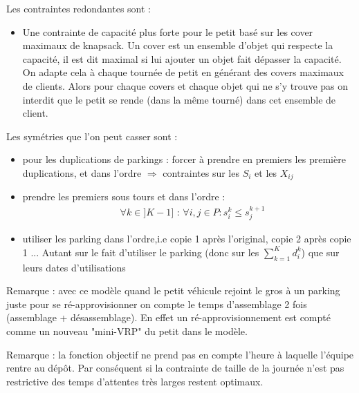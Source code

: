 \documentclass[12pt,a4paper,fleqn]{article}
\begin{document}
\clearpage

Les contraintes redondantes sont :
\begin{itemize}
\item Une contrainte de capacité plus forte pour le petit basé sur les cover maximaux de knapsack. Un cover est un ensemble d'objet qui respecte la capacité, il est dit maximal si lui ajouter un objet fait dépasser la capacité. On adapte cela à chaque tournée de petit en générant des covers maximaux de clients. Alors pour chaque covers et chaque objet qui ne s'y trouve pas on interdit que le petit se rende (dans la même tourné) dans cet ensemble de client.
\end{itemize}


Les symétries que l'on peut casser sont :
\begin{itemize}
\item pour les duplications de parkings : forcer à prendre en premiers les première duplications, et dans l'ordre $\Rightarrow$ contraintes sur les $S_i$ et les $X_{ij}$
\item prendre les premiers sous tours et dans l'ordre :
\begin{align}
& \forall k \in ]K-1] \text{ : } \forall i,j \in P : s^k_i \leqslant s^{k+1}_j \label{symetriesoustours2}
\end{align}
\item utiliser les parking dans l'ordre,i.e copie 1 après l'original, copie 2 après copie 1 ... Autant sur le fait d'utiliser le parking (donc sur les $\sum \limits_{k = 1}^K d_i^k$) que sur leurs dates d'utilisations
\end{itemize}

\bigskip

Remarque : avec ce modèle quand le petit véhicule rejoint le gros à un parking juste pour se ré-approvisionner on compte le temps d'assemblage 2 fois (assemblage + désassemblage). En effet un ré-approvisionnement est compté comme un nouveau "mini-VRP" du petit dans le modèle.

\bigskip

Remarque : la fonction objectif ne prend pas en compte l'heure à laquelle l'équipe rentre au dépôt. Par conséquent si la contrainte de taille de la journée n'est pas restrictive des temps d’attentes très larges restent optimaux.
\end{document}
